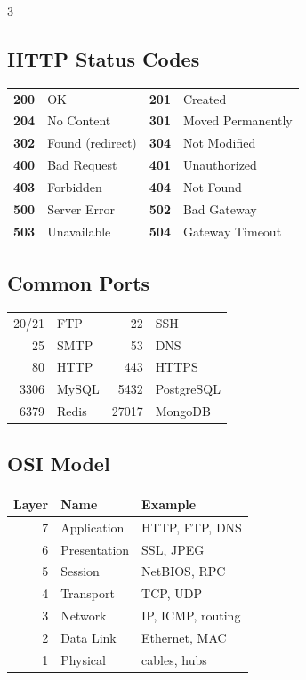 \documentclass[7pt,landscape]{extarticle}
\begin{document}
\begin{multicols*}{3}
\subsection*{HTTP Status Codes}
{\fontsize{5.5pt}{6.5pt}\selectfont
\begin{tabular}{@{}r@{\,}l@{\,}r@{\,}l@{}}
\textbf{200} & OK & \textbf{201} & Created \\
\textbf{204} & No Content & \textbf{301} & Moved Permanently \\
\textbf{302} & Found (redirect) & \textbf{304} & Not Modified \\
\textbf{400} & Bad Request & \textbf{401} & Unauthorized \\
\textbf{403} & Forbidden & \textbf{404} & Not Found \\
\textbf{500} & Server Error & \textbf{502} & Bad Gateway \\
\textbf{503} & Unavailable & \textbf{504} & Gateway Timeout \\
\end{tabular}}

\subsection*{Common Ports}
{\fontsize{5.5pt}{6.5pt}\selectfont
\begin{tabular}{@{}r@{\,}l@{\,}r@{\,}l@{}}
20/21 & FTP & 22 & SSH \\
25 & SMTP & 53 & DNS \\
80 & HTTP & 443 & HTTPS \\
3306 & MySQL & 5432 & PostgreSQL \\
6379 & Redis & 27017 & MongoDB \\
\end{tabular}}

\subsection*{OSI Model}
{\fontsize{5.5pt}{6.5pt}\selectfont
\begin{tabular}{@{}r@{\,}l@{\,}l@{}}
\toprule
\textbf{Layer} & \textbf{Name} & \textbf{Example} \\
\midrule
7 & Application & HTTP, FTP, DNS \\
6 & Presentation & SSL, JPEG \\
5 & Session & NetBIOS, RPC \\
4 & Transport & TCP, UDP \\
3 & Network & IP, ICMP, routing \\
2 & Data Link & Ethernet, MAC \\
1 & Physical & cables, hubs \\
\bottomrule
\end{tabular}}


\end{multicols*}
\end{document}

